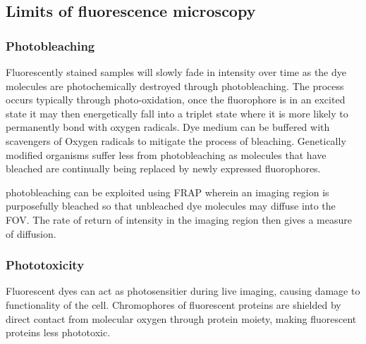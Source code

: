 \subsection{Limits of fluorescence microscopy}

\subsubsection{Photobleaching}

Fluorescently stained samples will slowly fade in intensity over time as the dye molecules are photochemically destroyed through photobleaching.
The process occurs typically through photo-oxidation, once the \gls{fluorophore} is in an excited state it may then energetically fall into a triplet state where it is more likely to permanently bond with oxygen radicals.
Dye medium can be buffered with scavengers of Oxygen radicals to mitigate the process of bleaching.
Genetically modified organisms suffer less from photobleaching as molecules that have bleached are continually being replaced by newly expressed \gls{fluorophore}s.

\Gls{photobleaching} can be exploited using \gls{FRAP} wherein an imaging region is purposefully bleached so that unbleached dye molecules may diffuse into the \gls{FOV}.
The rate of return of intensity in the imaging region then gives a measure of diffusion.


\subsubsection{Phototoxicity}

Fluorescent dyes can act as \gls{photosensitier} during live imaging, causing damage to functionality of the cell.
Chromophores of fluorescent proteins are shielded by direct contact from molecular oxygen through protein moiety, making fluorescent proteins less phototoxic.


